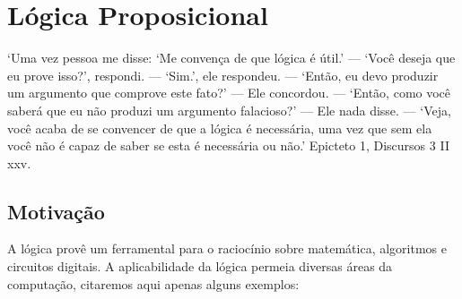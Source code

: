 \chapter{L\'ogica Proposicional}

\begin{chapquote}
`Uma vez pessoa me disse: `Me conven\c{c}a de que l\'ogica \'e \'util.' --- `Voc\^e deseja que eu prove isso?', respondi.
--- `Sim.', ele respondeu. --- `Ent\~ao, eu devo produzir um argumento que comprove este fato?' --- Ele concordou. --- `Ent\~ao,
como voc\^e saber\'a que eu n\~ao produzi um argumento falacioso?' --- Ele nada disse. --- `Veja, voc\^e acaba de se convencer
de que a l\'ogica \'e necess\'aria, uma vez que sem ela voc\^e n\~ao \'e capaz de saber se esta \'e necess\'aria ou n\~ao.'
Epicteto 1, Discursos 3 II xxv.
\end{chapquote}

\section{Motiva\c{c}\~ao}

A l\'ogica prov\^e um ferramental para o racioc\'inio sobre matem\'atica, algoritmos
e circuitos digitais. A aplicabilidade da l\'ogica permeia diversas \'areas da computa\c{c}\~ao,
citaremos aqui apenas alguns exemplos:


